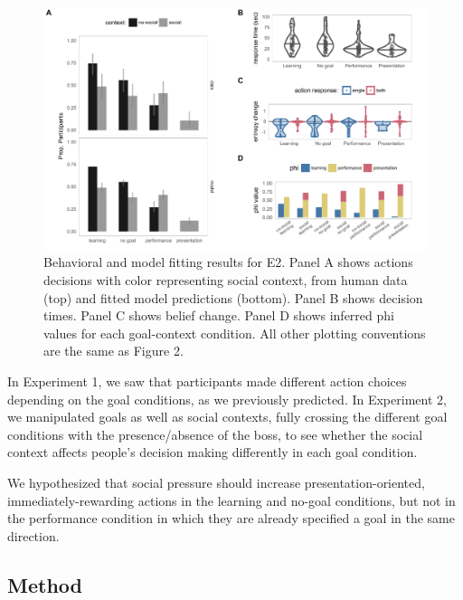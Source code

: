 \documentclass[10pt, letterpaper]{article}
\newenvironment{CodeChunk}{}{}
\begin{document}
\begin{CodeChunk}
\begin{figure}[tb]

{\centering \includegraphics[width=0.95\linewidth]{figs/e2_results-1} 

}

\caption[Behavioral and model fitting results for E2]{Behavioral and model fitting results for E2. Panel A shows actions decisions with color representing social context, from human data (top) and fitted model predictions (bottom). Panel B shows decision times. Panel C shows belief change. Panel D shows inferred phi values for each goal-context condition. All other plotting conventions are the same as Figure 2.}\label{fig:e2_results}
\end{figure}
\end{CodeChunk}

In Experiment 1, we saw that participants made different action choices
depending on the goal conditions, as we previously predicted. In
Experiment 2, we manipulated goals as well as social contexts, fully
crossing the different goal conditions with the presence/absence of the
boss, to see whether the social context affects people's decision making
differently in each goal condition.

We hypothesized that social pressure should increase
presentation-oriented, immediately-rewarding actions in the learning and
no-goal conditions, but not in the performance condition in which they
are already specified a goal in the same direction.

\subsection{Method}\label{method-1}
\end{document}
